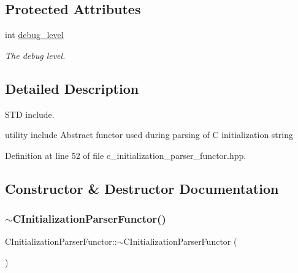 \subsection*{Protected Attributes}
\begin{DoxyCompactItemize}
\item 
int \hyperlink{classCInitializationParserFunctor_ac8a4c644de72a75e2ab5b0ed3403bfc5}{debug\+\_\+level}
\begin{DoxyCompactList}\small\item\em The debug level. \end{DoxyCompactList}\end{DoxyCompactItemize}


\subsection{Detailed Description}
S\+TD include. 

utility include Abstract functor used during parsing of C initialization string 

Definition at line 52 of file c\+\_\+initialization\+\_\+parser\+\_\+functor.\+hpp.



\subsection{Constructor \& Destructor Documentation}
\mbox{\label{classCInitializationParserFunctor_a1664fd9a14befd2f87791dcd694d8416}} 
\subsubsection{\texorpdfstring{$\sim$\+C\+Initialization\+Parser\+Functor()}{~CInitializationParserFunctor()}}
{\footnotesize\ttfamily C\+Initialization\+Parser\+Functor\+::$\sim$\+C\+Initialization\+Parser\+Functor (\begin{DoxyParamCaption}{ }\end{DoxyParamCaption})\hspace{0.3cm}{\ttfamily [virtual]}}



